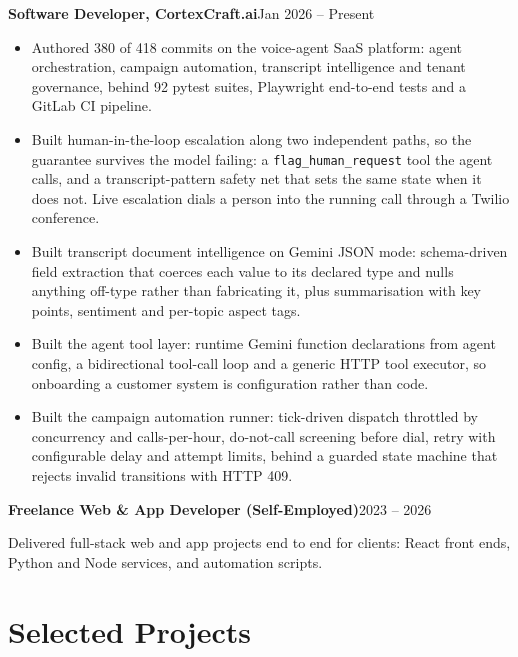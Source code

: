 \documentclass[10pt,a4paper]{article}
\newcommand{\entry}[2]{\textbf{#1}\hfill{#2}\par}
\begin{document}
\entry{Software Developer, CortexCraft.ai}{Jan 2026 -- Present}
\begin{itemize}
  \item Authored 380 of 418 commits on the voice-agent SaaS platform: agent orchestration, campaign
        automation, transcript intelligence and tenant governance, behind 92 pytest suites,
        Playwright end-to-end tests and a GitLab CI pipeline.
  \item Built human-in-the-loop escalation along two independent paths, so the guarantee survives the
        model failing: a \texttt{flag\_\allowbreak{}human\_\allowbreak{}request} tool the agent calls, and a transcript-pattern
        safety net that sets the same state when it does not. Live escalation dials a person into the
        running call through a Twilio conference.
  \item Built transcript document intelligence on Gemini JSON mode: schema-driven field extraction
        that coerces each value to its declared type and nulls anything off-type rather than
        fabricating it, plus summarisation with key points, sentiment and per-topic aspect tags.
  \item Built the agent tool layer: runtime Gemini function declarations from agent config, a
        bidirectional tool-call loop and a generic HTTP tool executor, so onboarding a customer
        system is configuration rather than code.
  \item Built the campaign automation runner: tick-driven dispatch throttled by concurrency and
        calls-per-hour, do-not-call screening before dial, retry with configurable delay and attempt
        limits, behind a guarded state machine that rejects invalid transitions with HTTP 409.
\end{itemize}

\vspace{1pt}
\entry{Freelance Web \& App Developer (Self-Employed)}{2023 -- 2026}
Delivered full-stack web and app projects end to end for clients: React front ends, Python and Node
services, and automation scripts.

\section{Selected Projects}
\end{document}

